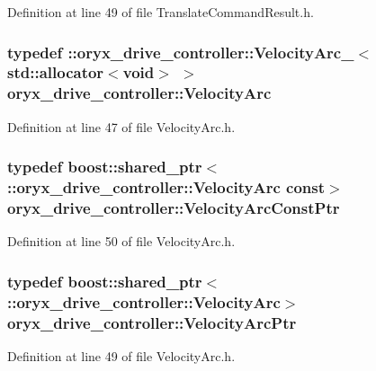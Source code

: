\-Definition at line 49 of file \-Translate\-Command\-Result.\-h.

\subsubsection[{\-Velocity\-Arc}]{\setlength{\rightskip}{0pt plus 5cm}typedef \-::{\bf oryx\-\_\-drive\-\_\-controller\-::\-Velocity\-Arc\-\_\-}$<$std\-::allocator$<$void$>$ $>$ {\bf oryx\-\_\-drive\-\_\-controller\-::\-Velocity\-Arc}}\label{namespaceoryx__drive__controller_abc26185b3bb85e07e3d324616450cf9f}


\-Definition at line 47 of file \-Velocity\-Arc.\-h.

\subsubsection[{\-Velocity\-Arc\-Const\-Ptr}]{\setlength{\rightskip}{0pt plus 5cm}typedef boost\-::shared\-\_\-ptr$<$ \-::{\bf oryx\-\_\-drive\-\_\-controller\-::\-Velocity\-Arc} const$>$ {\bf oryx\-\_\-drive\-\_\-controller\-::\-Velocity\-Arc\-Const\-Ptr}}\label{namespaceoryx__drive__controller_ae8bcf0d2781bab938fc0b428f43aefc3}


\-Definition at line 50 of file \-Velocity\-Arc.\-h.

\subsubsection[{\-Velocity\-Arc\-Ptr}]{\setlength{\rightskip}{0pt plus 5cm}typedef boost\-::shared\-\_\-ptr$<$ \-::{\bf oryx\-\_\-drive\-\_\-controller\-::\-Velocity\-Arc}$>$ {\bf oryx\-\_\-drive\-\_\-controller\-::\-Velocity\-Arc\-Ptr}}\label{namespaceoryx__drive__controller_aff78192991ffd8e0399113f6571a8868}


\-Definition at line 49 of file \-Velocity\-Arc.\-h.


